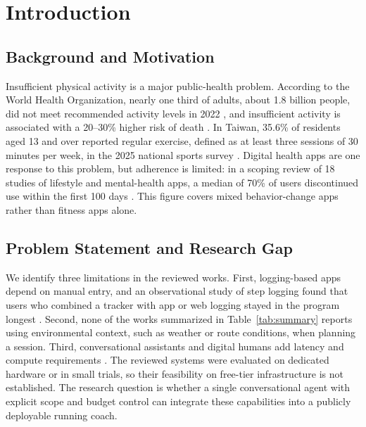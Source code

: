 \section{Introduction}\label{sec:intro}
\subsection{Background and Motivation}
Insufficient physical activity is a major public-health problem. According to the World Health Organization, nearly one third of adults, about 1.8 billion people, did not meet recommended activity levels in 2022 \cite{who2024news}, and insufficient activity is associated with a 20--30\% higher risk of death \cite{who_pa}. In Taiwan, 35.6\% of residents aged 13 and over reported regular exercise, defined as at least three sessions of 30 minutes per week, in the 2025 national sports survey \cite{pts2025}. Digital health apps are one response to this problem, but adherence is limited: in a scoping review of 18 studies of lifestyle and mental-health apps, a median of 70\% of users discontinued use within the first 100 days \cite{kidman2024}. This figure covers mixed behavior-change apps rather than fitness apps alone.

\subsection{Problem Statement and Research Gap}
We identify three limitations in the reviewed works. First, logging-based apps depend on manual entry, and an observational study of step logging found that users who combined a tracker with app or web logging stayed in the program longest \cite{rayward2021}. Second, none of the works summarized in Table~\ref{tab:summary} reports using environmental context, such as weather or route conditions, when planning a session. Third, conversational assistants and digital humans add latency and compute requirements \cite{liu2025livatar}. The reviewed systems were evaluated on dedicated hardware or in small trials, so their feasibility on free-tier infrastructure is not established. The research question is whether a single conversational agent with explicit scope and budget control can integrate these capabilities into a publicly deployable running coach.

